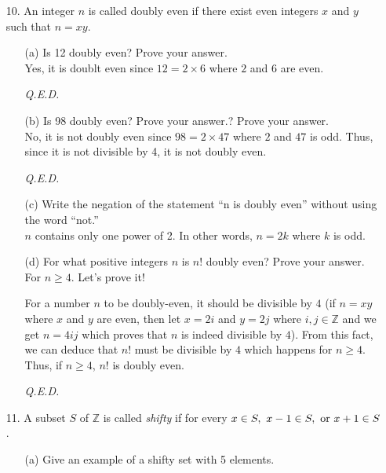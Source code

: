 \documentclass[12pt, a4paper]{article}                  %
\begin{document}
\begin{enumerate}
\item[10.]
An integer $n$ is called doubly even if there exist even integers $x$ and $y$ such that $n = xy$.
\begin{enumerate}
\item[(a)]
Is 12 doubly even? Prove your answer.\\

Yes, it is doublt even since $12 = 2 \times 6$ where $2$ and $6$ are even.
\begin{flushright}
\textit{Q.E.D.}
\end{flushright}
\item[(b)]
Is 98 doubly even? Prove your answer.? Prove your answer.\\

No, it is not doubly even since $98 = 2 \times 47$ where $2$ and $47$ is odd.
Thus, since it is not divisible by 4, it is not doubly even.
\begin{flushright}
\textit{Q.E.D.}
\end{flushright}
\item[(c)]
Write the negation of the statement “n is doubly even” without using the word
“not.”\\

$n$ contains only one power of 2. In other words, $n = 2k$ where $k$ is odd.
\\
\item[(d)]
For what positive integers $n$ is $n!$ doubly even? Prove your answer.\\

For $n \geq 4$. Let's prove it!

For a number $n$ to be doubly-even, it should be divisible by $4$
(if $n = xy$ where $x$ and $y$ are even, then let $x = 2i$ and $y = 2j$
where $i,j \in \mathbb{Z}$ and we get $n = 4ij$ which proves that $n$ is
indeed divisible by $4$). From this fact, we can deduce that $n!$ must
be divisible by $4$ which happens for $n \geq 4$. Thus, if $n \geq 4$, $n!$
is doubly even.
\begin{flushright}
\textit{Q.E.D.}
\end{flushright}
\end{enumerate}

\item[11.]
A subset $S$ of $\mathbb{Z}$ is called \textit{shifty} if for every $x \in S, \ x - 1 \in S, \ \textnormal{or} \ x + 1 \in S$.
\begin{enumerate}
\item[(a)]
Give an example of a shifty set with 5 elements.\\


\end{enumerate}
\end{enumerate}
\end{document}
